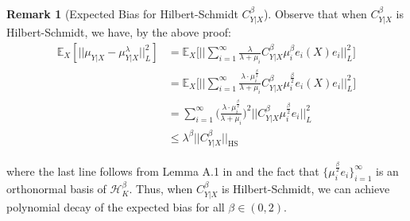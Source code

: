 \documentclass[accepted]{article}
\theoremstyle{definition}
\newtheorem*{remark}{Remark}
\begin{document}
\begin{remark}[Expected Bias for Hilbert-Schmidt $C^{\beta}_{Y|X}$]
Observe that when $C^{\beta}_{Y|X}$ is Hilbert-Schmidt, we have, by the above proof:
\begin{align*}
    \mathbb{E}_{X}[||\mu_{Y|X} - \mu^{\lambda}_{Y|X}||^2_{L}] & = \mathbb{E}_{X}\Big[\Big|\Big|\sum_{i = 1}^{\infty} \frac{\lambda}{\lambda + \mu_i} C^{\beta}_{Y|X} \mu^{\beta}_i e_i(X)e_i\Big|\Big|^2_{L}\Big] \\
    & = \mathbb{E}_{X}\Big[\Big|\Big|\sum_{i = 1}^{\infty} \frac{\lambda \cdot \mu^{\frac{\beta}{2}}_i}{\lambda + \mu_i} C^{\beta}_{Y|X} \mu^{\frac{\beta}{2}}_i e_i(X)e_i\Big|\Big|^2_{L}\Big] \\
    & = \sum_{i = 1}^{\infty} \Big(\frac{\lambda \cdot \mu^{\frac{\beta}{2}}_i}{\lambda + \mu_i}\Big)^2 ||C^{\beta}_{Y|X} \mu^{\frac{\beta}{2}}_i e_i||^2_{L} \\
    & \leq \lambda^{\beta} ||C^{\beta}_{Y|X}||_{\text{HS}}
\end{align*}
\end{remark}
where the last line follows from Lemma A.1 in \cite{fischer2020sobolev} and the fact that $\{\mu^{\frac{\beta}{2}}_i e_i\}_{i = 1}^{\infty}$ is an orthonormal basis of $\mathcal{H}^{\beta}_K$. Thus, when $C^{\beta}_{Y|X}$ is Hilbert-Schmidt, we can achieve polynomial decay of the expected bias for all $\beta \in (0, 2)$. 
\end{document}
